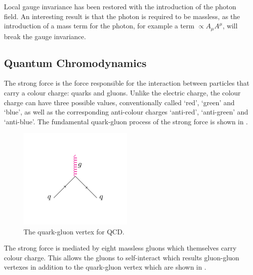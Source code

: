 Local gauge invariance has been restored with the introduction of the photon
field. An interesting result is that the photon is required to be massless, as
the introduction of a mass term for the photon, for example a term $\propto
A_{\mu}A^{\mu}$, will break the gauge invariance.

\subsection{Quantum Chromodynamics}
\label{sec:QCD}
The strong force is the force responsible for the interaction between particles
that carry a colour charge: quarks and gluons. Unlike the electric charge, the
colour charge can have three possible values, conventionally called `red',
`green' and `blue', as well as the corresponding anti-colour charges
`anti-red', `anti-green' and `anti-blue'.
The fundamental quark-gluon process of the strong force is shown in
.
\begin{figure}[htbp]
  \centering
  \includegraphics[width=0.5\textwidth]{qcd_process}
  \caption{The quark-gluon vertex for {QCD}.}
  \label{fig:qcdquark}
\end{figure}
The strong force is mediated by eight massless gluons which themselves carry
colour charge. This allows the gluons to self-interact which results gluon-gluon
vertexes in addition to the quark-gluon vertex which are shown in
.

